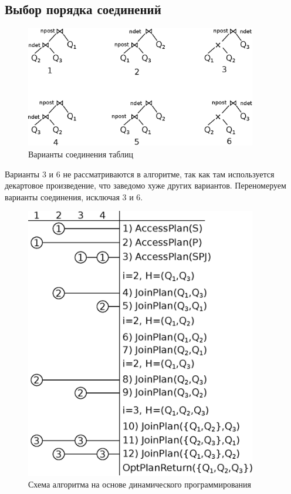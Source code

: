 \documentclass[russian,utf8,emptystyle]{eskdtext}
\begin{document}
\clearpage
\subsection{Выбор порядка соединений}
\begin{figure}[h!]
\includegraphics[width=0.9\textwidth]{join_variants}
\caption{Варианты соединения таблиц}
\label{fig:join_variants}
\end{figure}

Варианты 3 и 6 не рассматриваются в алгоритме, так как там используется декартовое произведение, что заведомо хуже других вариантов. Переномеруем варианты соединения, исключая 3 и 6.

\clearpage
\begin{figure}[h!]
\centering
\includegraphics[width=0.9\textwidth]{join_plan_table}
\caption{Схема алгоритма на основе динамического программирования}
\label{fig:logic_plan_table}
\end{figure}
\end{document}
